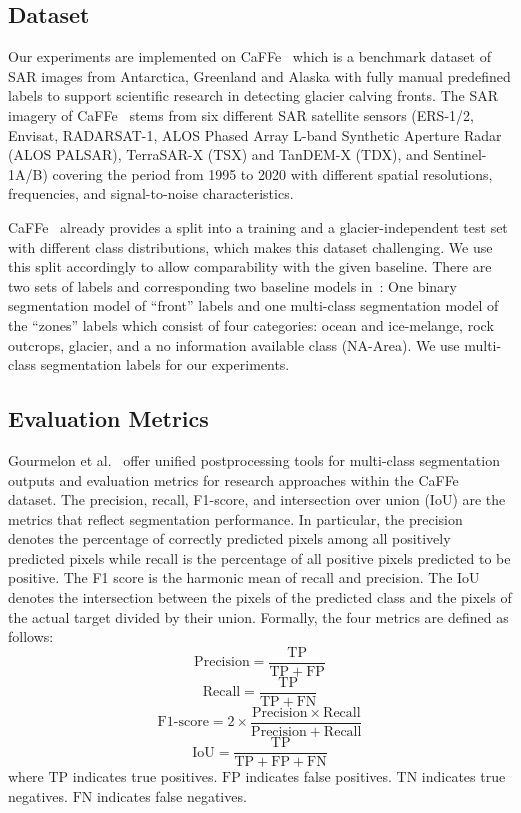 \documentclass[lettersize,journal,siunitx]{IEEEtran}
\begin{document}
\subsection{Dataset}
Our experiments are implemented on CaFFe~\cite{essd-14-4287-2022} which is a benchmark dataset of SAR images from Antarctica, Greenland and Alaska with fully manual predefined labels to support scientific research in detecting glacier calving fronts. The SAR imagery of CaFFe~\cite{essd-14-4287-2022} stems from six different SAR satellite sensors (ERS-1/2, Envisat, RADARSAT-1, ALOS Phased Array L-band Synthetic Aperture Radar (ALOS PALSAR), TerraSAR-X (TSX) and TanDEM-X (TDX), and Sentinel-1A/B) covering the period from 1995 to 2020 with different spatial resolutions, frequencies, and signal-to-noise characteristics.

CaFFe~\cite{essd-14-4287-2022} already provides a split into a training and a glacier-independent test set with different class distributions, which makes this dataset challenging. We use this split accordingly to allow comparability with the given baseline. There are two sets of labels and corresponding two baseline models in~\cite{essd-14-4287-2022}: One binary segmentation model of “front” labels and one multi-class segmentation model of the “zones” labels which consist of four categories: ocean and ice-melange, rock outcrops, glacier, and a no information available class (NA-Area). We use multi-class segmentation labels for our experiments.

\subsection{Evaluation Metrics}
Gourmelon et al.~\cite{essd-14-4287-2022} offer unified postprocessing tools for multi-class segmentation outputs and evaluation metrics for research approaches within the CaFFe~\cite{essd-14-4287-2022} dataset. The precision, recall, F1-score, and intersection over union (IoU) are the metrics that reflect segmentation performance. In particular, the precision denotes the percentage of correctly predicted pixels among all positively predicted pixels while recall is the percentage of all positive pixels predicted to be positive. The F1 score is the harmonic mean of recall and precision. The IoU denotes the intersection between the pixels of the predicted class and the pixels of the actual target divided by their union. Formally, the four metrics are defined as follows:
\begin{equation}
\mathrm{Precision=\frac{TP}{TP+FP}}
\end{equation}
\begin{equation}
\mathrm{Recall=\frac{TP}{TP+FN}}
\end{equation}
\begin{equation}
\mathrm{F1\mbox{-}score=2\times\frac{Precision\times Recall}{Precision+Recall}}
\end{equation}
\begin{equation}
\mathrm{IoU=\frac{TP}{TP+FP+FN}}
\end{equation}
where $\mathrm{TP}$ indicates true positives. $\mathrm{FP}$ indicates false positives. $\mathrm{TN}$ indicates true negatives. $\mathrm{FN}$ indicates false negatives.
\end{document}
